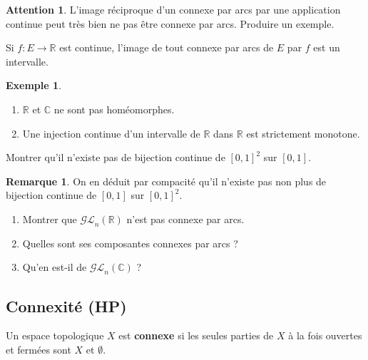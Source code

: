 \documentclass[french]{article}
\newcommand{\R}{\mathbb{R}}
\newcommand{\C}{\mathbb{C}}
\theoremstyle{plain}
\theoremstyle{definition}
\newtheorem*{ex}{Exemple}
\newtheorem*{rmq}{Remarque}
\newtheorem*{attention}{Attention}
\theoremstyle{remark}
\begin{document}
\begin{attention}
	L'image réciproque d'un connexe par arcs par une application continue peut très bien ne pas être connexe par arcs. Produire un exemple.
\end{attention}

\begin{cor}%
	Si $f:E\to\R$ est continue, l'image de tout connexe par arcs de $E$ par $f$ est un intervalle.
\end{cor}

\begin{ex}
	\begin{enumerate}
		\item $\R$ et $\C$ ne sont pas homéomorphes.
		\item Une injection continue d'un intervalle de $\R$ dans $\R$ est strictement monotone.
	\end{enumerate}
\end{ex}

\begin{exo}
	Montrer qu'il n'existe pas de bijection continue de $[0,1]^2$ sur $[0,1]$.
\end{exo}

\begin{rmq}
	On en déduit par compacité qu'il n'existe pas non plus de bijection continue de $[0,1]$ sur $[0,1]^2$.
\end{rmq}

\begin{exo}[$\Delta$]
	\begin{enumerate}
		\item Montrer que $\mathcal{GL}_n(\R)$ n'est pas connexe par arcs. %
		\item Quelles sont ses composantes connexes par arcs ? %
		\item Qu'en est-il de $\mathcal{GL}_n(\C)$ ?
	\end{enumerate}
\end{exo}

\subsection{Connexité (HP)}

\begin{dfn}
	Un espace topologique $X$ est \textbf{connexe} si les seules parties de $X$ à la fois ouvertes et fermées sont $X$ et $\emptyset$.
\end{dfn}
\end{document}
